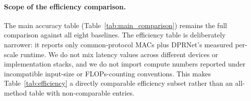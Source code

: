 \paragraph{Scope of the efficiency comparison.}
The main accuracy table (Table~\ref{tab:main_comparison}) remains the full comparison
against all eight baselines. The efficiency table is deliberately narrower: it reports
only common-protocol MACs plus DPRNet's measured per-scale runtime. We do not mix
latency values across different devices or implementation stacks, and we do not import
compute numbers reported under incompatible input-size or FLOPs-counting conventions.
This makes Table~\ref{tab:efficiency} a directly comparable efficiency subset rather
than an all-method table with non-comparable entries.

